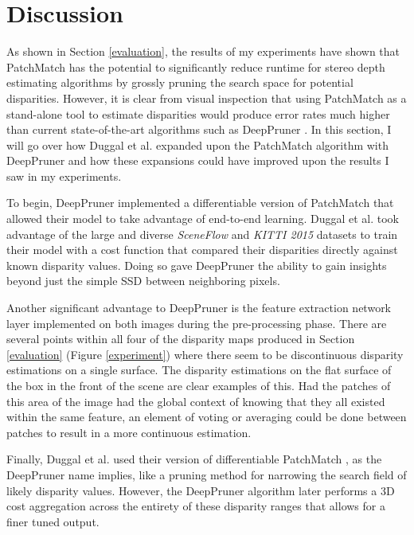 \documentclass{article}
\begin{document}
\section{Discussion}
\label{discussion}
As shown in Section \ref{evaluation}, the results of my experiments have shown that PatchMatch \citep{barnes2009patchmatch} has the potential to significantly reduce runtime for stereo depth estimating algorithms by grossly pruning the search space for potential disparities. However, it is clear from visual inspection that using PatchMatch as a stand-alone tool to estimate disparities would produce error rates much higher than current state-of-the-art algorithms such as DeepPruner \citep{duggal2019deeppruner}. In this section, I will go over how Duggal et al. expanded upon the PatchMatch algorithm with DeepPruner and how these expansions could have improved upon the results I saw in my experiments.

To begin, DeepPruner \citep{duggal2019deeppruner} implemented a differentiable version of PatchMatch \citep{barnes2009patchmatch} that allowed their model to take advantage of end-to-end learning. Duggal et al. took advantage of the large and diverse \textit{SceneFlow} \citep{mayer2016large} and \textit{KITTI 2015} \citep{geiger2012we} datasets to train their model with a cost function that compared their disparities directly against known disparity values. Doing so gave DeepPruner the ability to gain insights beyond just the simple SSD between neighboring pixels.

Another significant advantage to DeepPruner \citep{duggal2019deeppruner} is the feature extraction network layer implemented on both images during the pre-processing phase. There are several points within all four of the disparity maps produced in Section \ref{evaluation} (Figure \ref{experiment}) where there seem to be discontinuous disparity estimations on a single surface. The disparity estimations on the flat surface of the box in the front of the scene are clear examples of this. Had the patches of this area of the image had the global context of knowing that they all existed within the same feature, an element of voting or averaging could be done between patches to result in a more continuous estimation.

Finally, Duggal et al. \citep{duggal2019deeppruner} used their version of differentiable PatchMatch \citep{barnes2009patchmatch}, as the DeepPruner name implies, like a pruning method for narrowing the search field of likely disparity values. However, the DeepPruner algorithm later performs a 3D cost aggregation across the entirety of these disparity ranges that allows for a finer tuned output.
\end{document}
